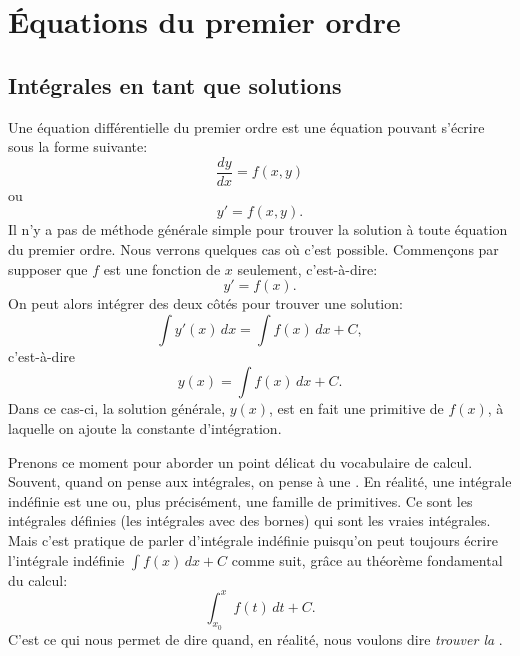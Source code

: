 \chapter{Équations du premier ordre} \label{fo:chapter}


\section{Intégrales en tant que solutions}
\label{integralsols:section}


Une équation différentielle du premier ordre est une équation pouvant s'écrire sous la forme suivante:
\begin{equation*}
	\frac{dy}{dx} = f(x,y)
\end{equation*}
ou
\begin{equation*}
	y' = f(x,y) .
\end{equation*}
Il n'y a pas de méthode générale simple pour trouver la solution  à toute équation du premier ordre.
Nous verrons quelques cas où c'est possible.
Commençons par supposer que $f$ est une fonction de $x$ seulement, c'est-à-dire:
\begin{equation} \label{ias:inteq}
	y' = f(x) .
\end{equation}
On peut alors intégrer des deux côtés pour trouver une solution:
\begin{equation*}
	\int y'(x) \,dx = \int f(x) \,dx + C ,
\end{equation*}
c'est-à-dire
\begin{equation*}
	y(x) = \int f(x) \,dx + C .
\end{equation*}
Dans ce cas-ci, la solution générale, $y(x)$, est en fait une primitive de $f(x)$,
à laquelle on ajoute la constante d'intégration.

\medskip

Prenons ce moment pour aborder un point délicat du vocabulaire de calcul.
Souvent, quand on pense aux intégrales, on pense à une .
En réalité, une intégrale indéfinie est une \emph{} ou, plus précisément, une famille de primitives.
Ce sont les intégrales définies (les intégrales avec des bornes) qui sont les vraies intégrales.
Mais c'est pratique de parler d'intégrale \og{}indéfinie\fg{} puisqu'on peut toujours écrire l'intégrale indéfinie
$\int f(x) \,dx + C$ comme suit, grâce au théorème fondamental du calcul:
\begin{equation*}
	\int_{x_0}^x f(t) \,dt + C .
\end{equation*}
C'est ce qui nous permet de dire \emph{} quand, en réalité,
nous voulons dire \emph{trouver la }.

